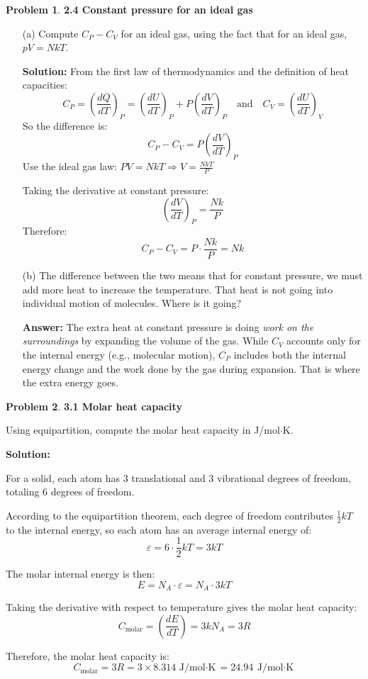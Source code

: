 \documentclass[12pt]{article}
\theoremstyle{definition} %
\newtheorem{problem}{Problem}
\theoremstyle{plain} %
\begin{document}
\begin{problem}
    \textbf{2.4 Constant pressure for an ideal gas}

    \begin{enumerate}
        \item[(a)] Compute $C_P - C_V$ for an ideal gas, using the fact that for an ideal gas, $pV = NkT$.

        \textbf{Solution:} From the first law of thermodynamics and the definition of heat capacities:
        \[
        C_P = \left( \frac{dQ}{dT} \right)_P = \left( \frac{dU}{dT} \right)_P + P \left( \frac{dV}{dT} \right)_P
        \quad \text{and} \quad
        C_V = \left( \frac{dU}{dT} \right)_V
        \]
        So the difference is:
        \[
        C_P - C_V = P \left( \frac{dV}{dT} \right)_P
        \]
        Use the ideal gas law: $PV = NkT \Rightarrow V = \frac{NkT}{P}$

        Taking the derivative at constant pressure:
        \[
        \left( \frac{dV}{dT} \right)_P = \frac{Nk}{P}
        \]
        Therefore:
        \[
        C_P - C_V = P \cdot \frac{Nk}{P} = Nk
        \]

        \item[(b)] The difference between the two means that for constant pressure, we must add more heat to increase the temperature. That heat is not going into individual motion of molecules. Where is it going?

        \textbf{Answer:} The extra heat at constant pressure is doing \emph{work on the surroundings} by expanding the volume of the gas. While $C_V$ accounts only for the internal energy (e.g., molecular motion), $C_P$ includes both the internal energy change and the work done by the gas during expansion. That is where the extra energy goes.
    \end{enumerate}
\end{problem}

\begin{problem}
    \textbf{3.1 Molar heat capacity}

    Using equipartition, compute the molar heat capacity in J/mol$\cdot$K.

    \textbf{Solution:}

    For a solid, each atom has 3 translational and 3 vibrational degrees of freedom, totaling 6 degrees of freedom.

    According to the equipartition theorem, each degree of freedom contributes $\frac{1}{2}kT$ to the internal energy, so each atom has an average internal energy of:
    \[
        \varepsilon = 6 \cdot \frac{1}{2}kT = 3kT
    \]

    The molar internal energy is then:
    \[
        E = N_A \cdot \varepsilon = N_A \cdot 3kT
    \]

    Taking the derivative with respect to temperature gives the molar heat capacity:
    \[
        C_{\text{molar}} = \left( \frac{dE}{dT} \right) = 3kN_A = 3R
    \]

    Therefore, the molar heat capacity is:
    \[
        C_{\text{molar}} = 3R = 3 \times 8.314\, \text{J/mol$\cdot$K} = \boxed{24.94\ \text{J/mol$\cdot$K}}
    \]
\end{problem}
\end{document}
